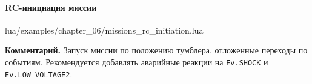 \paragraph{RC-инициация миссии}
\begin{codefile}{lua/examples/chapter_06/missions_rc_initiation.lua}
\end{codefile}
\textbf{Комментарий.} Запуск миссии по положению тумблера, отложенные переходы по событиям. Рекомендуется добавлять аварийные реакции на \texttt{Ev.SHOCK} и \texttt{Ev.LOW\_VOLTAGE2}.
